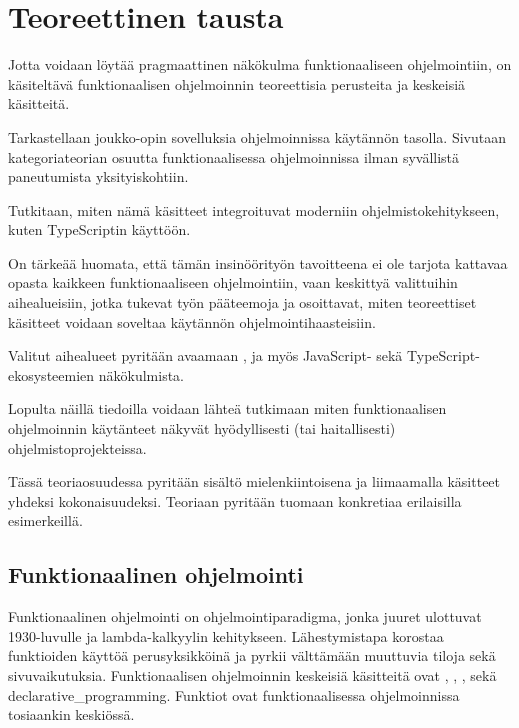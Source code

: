 \vspace{21.5pt}
\chapter{Teoreettinen tausta}

Jotta voidaan löytää pragmaattinen näkökulma funktionaaliseen ohjelmointiin, on käsiteltävä funktionaalisen ohjelmoinnin teoreettisia perusteita ja keskeisiä käsitteitä.

Tarkastellaan joukko-opin sovelluksia ohjelmoinnissa käytännön tasolla. Sivutaan kategoriateorian osuutta funktionaalisessa ohjelmoinnissa ilman syvällistä paneutumista yksityiskohtiin.

Tutkitaan, miten nämä käsitteet integroituvat moderniin ohjelmistokehitykseen, kuten TypeScriptin käyttöön.

On tärkeää huomata, että tämän insinöörityön tavoitteena ei ole tarjota kattavaa opasta kaikkeen funktionaaliseen ohjelmointiin, vaan keskittyä valittuihin aihealueisiin, jotka tukevat työn pääteemoja ja osoittavat, miten teoreettiset käsitteet voidaan soveltaa käytännön ohjelmointihaasteisiin.

Valitut aihealueet pyritään avaamaan , ja myös JavaScript- sekä TypeScript-ekosysteemien näkökulmista.

Lopulta näillä tiedoilla voidaan lähteä tutkimaan miten funktionaalisen ohjelmoinnin käytänteet näkyvät hyödyllisesti (tai haitallisesti) ohjelmistoprojekteissa.

Tässä teoriaosuudessa pyritään sisältö mielenkiintoisena ja liimaamalla käsitteet yhdeksi kokonaisuudeksi. Teoriaan pyritään tuomaan konkretiaa erilaisilla esimerkeillä.

\section{Funktionaalinen ohjelmointi}

Funktionaalinen ohjelmointi on ohjelmointiparadigma, jonka juuret ulottuvat 1930-luvulle ja lambda-kalkyylin kehitykseen. Lähestymistapa korostaa funktioiden käyttöä perusyksikköinä ja pyrkii välttämään muuttuvia tiloja sekä sivuvaikutuksia. Funktionaalisen ohjelmoinnin keskeisiä käsitteitä ovat , , , sekä \gls{declarative_programming}. Funktiot ovat funktionaalisessa ohjelmoinnissa tosiaankin keskiössä. \citep{Tan2004,computerphile_lambda}


